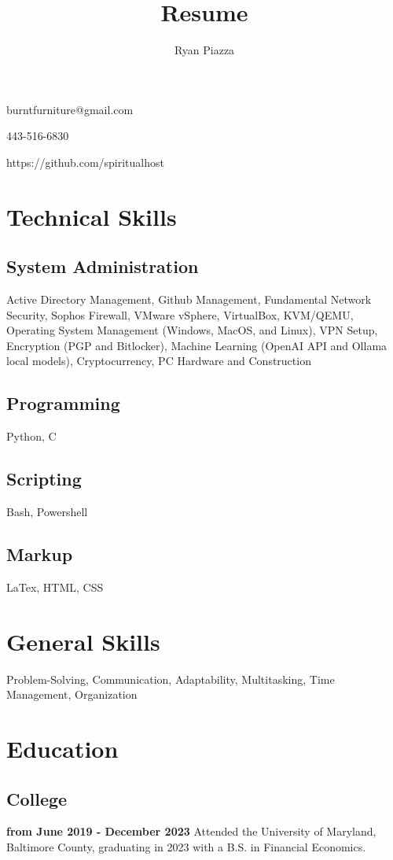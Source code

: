 \documentclass{article}
\makeatletter
\renewcommand{\maketitle}{
	\begin{center}
		{\huge\bfseries\theauthor}
		
		\vspace{.5em}

		burntfurniture@gmail.com

		443-516-6830

		https://github.com/spiritualhost
	\end{center}
}
\makeatother
\begin{document}
\noindent

\title{Resume}
\author{Ryan Piazza}

\maketitle

\section{Technical Skills}

\subsection{System Administration}

Active Directory Management, Github Management, Fundamental Network Security, Sophos Firewall, VMware vSphere, VirtualBox, KVM/QEMU, Operating System Management (Windows, MacOS, and Linux), VPN Setup, Encryption (PGP and Bitlocker), Machine Learning (OpenAI API and Ollama local models), Cryptocurrency, PC Hardware and Construction

\subsection{Programming}

Python, C

\subsection{Scripting} 
Bash, Powershell

\subsection{Markup}
LaTex, HTML, CSS


\section{General Skills}

Problem-Solving, Communication, Adaptability, Multitasking, Time Management, Organization

\section{Education}

\subsection{College} \textbf{from June 2019 - December 2023}
Attended the University of Maryland, Baltimore County, graduating in 2023 with a B.S. in Financial Economics. 
\end{document}
